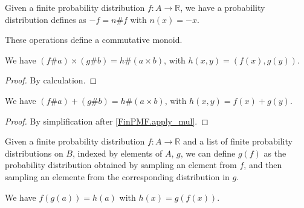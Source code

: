 \begin{definition}
    \label{instNegFinPMF}
    \leanok
    Given a finite probability distribution $f: A \to \mathbb{R}$, we have a probability distribution
    defines as $-f = n \# f$ with $n(x) = -x$.
\end{definition}

\begin{proposition}
    \label{FinPMFCommMonoid}
    \leanok
    These operations define a commutative monoid.
\end{proposition}


\begin{lemma}
    \label{FinPMF.apply_mul}
    \leanok
    We have $(f \# a) \times (g \# b) = h \# (a \times b)$, with $h(x, y) = (f(x), g(y))$.
\end{lemma}

\begin{proof}
    \leanok
    By calculation.
\end{proof}

\begin{lemma}
    \label{FinPMF.apply_add}
    \leanok
    We have $(f \# a) + (g \# b) = h \# (a \times b)$, with $h(x, y) = f(x) + g(y)$.
\end{lemma}

\begin{proof}
    \leanok
    By simplification after \ref{FinPMF.apply_mul}.
\end{proof}

\begin{definition}
    \label{FinPMF.linear_combination}
    \leanok
    Given a finite probability distribution $f: A \to \mathbb{R}$ and a list of finite probability distributions on $B$, indexed by
    elements of $A$, $g$, we can define $g(f)$ as the probability distribution obtained by sampling an element from $f$, and then
    sampling an elemente from the corresponding distribution in $g$.
\end{definition}


\begin{lemma}
    \label{linear_combination_linear_combination}
    \leanok
    We have $f(g(a)) = h(a)$ with $h(x) = g(f(x))$.
\end{lemma}

